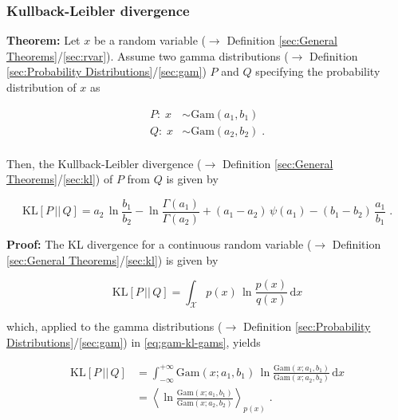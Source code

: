 \documentclass[a4paper,12pt,twoside]{book}
\begin{document}
\subsubsection[\textbf{Kullback-Leibler divergence}]{Kullback-Leibler divergence} \label{sec:gam-kl}
\setcounter{equation}{0}

\textbf{Theorem:} Let $x$ be a random variable ($\rightarrow$ Definition \ref{sec:General Theorems}/\ref{sec:rvar}). Assume two gamma distributions ($\rightarrow$ Definition \ref{sec:Probability Distributions}/\ref{sec:gam}) $P$ and $Q$ specifying the probability distribution of $x$ as

\begin{equation} \label{eq:gam-kl-gams}
\begin{split}
P: \; x &\sim \mathrm{Gam}(a_1, b_1) \\
Q: \; x &\sim \mathrm{Gam}(a_2, b_2) \; . \\
\end{split}
\end{equation}

Then, the Kullback-Leibler divergence ($\rightarrow$ Definition \ref{sec:General Theorems}/\ref{sec:kl}) of $P$ from $Q$ is given by

\begin{equation} \label{eq:gam-kl-gam-KL}
\mathrm{KL}[P\,||\,Q] = a_2 \, \ln \frac{b_1}{b_2} - \ln \frac{\Gamma(a_1)}{\Gamma(a_2)} + (a_1 - a_2) \, \psi(a_1) - (b_1 - b_2) \, \frac{a_1}{b_1} \; .
\end{equation}


\vspace{1em}
\textbf{Proof:} The KL divergence for a continuous random variable ($\rightarrow$ Definition \ref{sec:General Theorems}/\ref{sec:kl}) is given by 

\begin{equation} \label{eq:gam-kl-KL-cont}
\mathrm{KL}[P\,||\,Q] = \int_{\mathcal{X}} p(x) \, \ln \frac{p(x)}{q(x)} \, \mathrm{d}x
\end{equation}

which, applied to the gamma distributions ($\rightarrow$ Definition \ref{sec:Probability Distributions}/\ref{sec:gam}) in \eqref{eq:gam-kl-gams}, yields

\begin{equation} \label{eq:gam-kl-gam-KL-s1}
\begin{split}
\mathrm{KL}[P\,||\,Q] &= \int_{-\infty}^{+\infty} \mathrm{Gam}(x; a_1, b_1) \, \ln \frac{\mathrm{Gam}(x; a_1, b_1)}{\mathrm{Gam}(x; a_2, b_2)} \, \mathrm{d}x \\
&= \left\langle \ln \frac{\mathrm{Gam}(x; a_1, b_1)}{\mathrm{Gam}(x; a_2, b_2)} \right\rangle_{p(x)} \; .
\end{split}
\end{equation}
\end{document}
